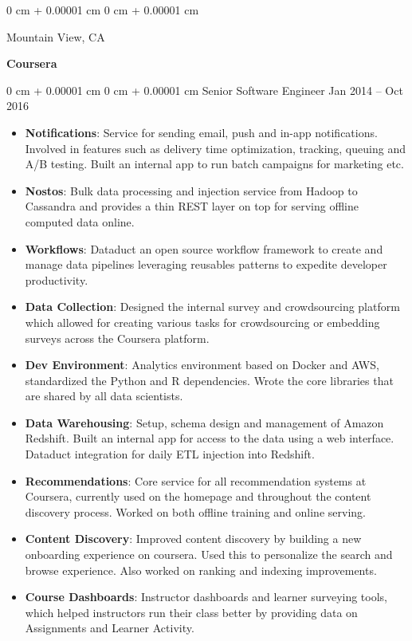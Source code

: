 \documentclass[letterpaper,11pt]{article}
\makeatletter
\newcommand{\resumeItem}[2]{
  \item\small{
    \textbf{#1}{: #2 \vspace{-2pt}}
  }
}
\newenvironment{onecolentry}{
    \begin{adjustwidth}{
        0 cm + 0.00001 cm
    }{
        0 cm + 0.00001 cm
    }
}{
    \end{adjustwidth}
} %
\newenvironment{twocolentry}[2][]{
    \onecolentry
    \def\secondColumn{#2}
    \setcolumnwidth{\fill, 4.5 cm}
    \begin{paracol}{2}
}{
    \switchcolumn \raggedleft \secondColumn
    \end{paracol}
    \endonecolentry
} %
\newcommand{\resumeSubSubheading}[2]{
    \begin{tabular*}{0.97\textwidth}{l@{\extracolsep{\fill}}r}
      \textit{\small#1} & \textit{\small #2} \\
    \end{tabular*}\vspace{-5pt}
}
\newcommand{\resumeItemListStart}{\begin{itemize}}
\newcommand{\resumeItemListEnd}{\end{itemize}\vspace{-5pt}}
\makeatother
\begin{document}


    
    \begin{twocolentry}{
            \textbf{Coursera}
        }  Mountain View, CA
        \end{twocolentry}
  \begin{onecolentry}{
            {Senior Software Engineer}
        }  Jan 2014 -- Oct 2016
        \end{onecolentry}

      \resumeItemListStart
        \resumeItem{Notifications}
          {Service for sending email, push and in-app notifications. Involved in features such as delivery time optimization, tracking, queuing and A/B testing. Built an internal app to run batch campaigns for marketing etc.}
        \resumeItem{Nostos}
          {Bulk data processing and injection service from Hadoop to Cassandra and provides a thin REST layer on top for serving offline computed data online.}
        \resumeItem{Workflows}
          {Dataduct an open source workflow framework to create and manage data pipelines leveraging reusables patterns to expedite developer productivity.}
        \resumeItem{Data Collection}
          {Designed the internal survey and crowdsourcing platform which allowed for creating various tasks for crowdsourcing or embedding surveys across the Coursera platform.}
        \resumeItem{Dev Environment}
          {Analytics environment based on Docker and AWS, standardized the Python and R dependencies. Wrote the core libraries that are shared by all data scientists.}
        \resumeItem{Data Warehousing}
          {Setup, schema design and management of Amazon Redshift. Built an internal app for access to the data using a web interface. Dataduct integration for daily ETL injection into Redshift.}
        \resumeItem{Recommendations}
          {Core service for all recommendation systems at Coursera, currently used on the homepage and throughout the content discovery process. Worked on both offline training and online serving.}
        \resumeItem{Content Discovery}
          {Improved content discovery by building a new onboarding experience on coursera. Used this to personalize the search and browse experience. Also worked on ranking and indexing improvements.}
        \resumeItem{Course Dashboards}
          {Instructor dashboards and learner surveying tools, which helped instructors run their class better by providing data on Assignments and Learner Activity.}
      \resumeItemListEnd
\end{document}
